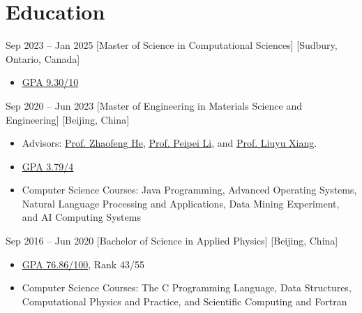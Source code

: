 \documentclass{chicv}
\begin{document}

\begin{basicinfo}

\end{basicinfo}

\section{Education}
  {Sep 2023 -- Jan 2025}
  [Master of Science in Computational Sciences]
  [Sudbury, Ontario, Canada]
  \begin{itemize}
    \item \href{https://drive.google.com/file/d/1MZu9b1cn0S4po1Xzixy2jizePa4-Uz5s/view?usp=sharing}{\underline{GPA 9.30/10}}
  \end{itemize}

  {Sep 2020 -- Jun 2023}
  [Master of Engineering in Materials Science and Engineering]
  [Beijing, China]
  \begin{itemize}
    \item Advisors: \href{https://teacher.bupt.edu.cn/hezhaofeng/en/index.htm}{\underline{Prof. Zhaofeng He}}, \href{https://teacher.bupt.edu.cn/lipeipei/en/index.htm}{\underline{Prof. Peipei Li}}, and \href{https://teacher.bupt.edu.cn/xiangliuyu/en/index.htm}{\underline{Prof. Liuyu Xiang}}.
    \item \href{https://drive.google.com/file/d/1Ss19fLouVF3mfJC_bPpnO3EJDIMEDVsh/view?usp=sharing}{\underline{GPA 3.79/4}}
    \item Computer Science Courses: Java Programming, Advanced Operating Systems, Natural Language Processing and Applications, Data Mining Experiment, and AI Computing Systems
  \end{itemize}

  {Sep 2016 -- Jun 2020}
  [Bachelor of Science in Applied Physics]
  [Beijing, China]
  \begin{itemize}
    \item \href{https://drive.google.com/file/d/1wXwDU8obJ-wQTqehL1LyUERxvtmTB7hh/view?usp=sharing}{\underline{GPA 76.86/100}}, Rank 43/55
    \item Computer Science Courses: The C Programming Language, Data Structures, Computational Physics and Practice, and Scientific Computing and Fortran
  \end{itemize}
\end{document}
